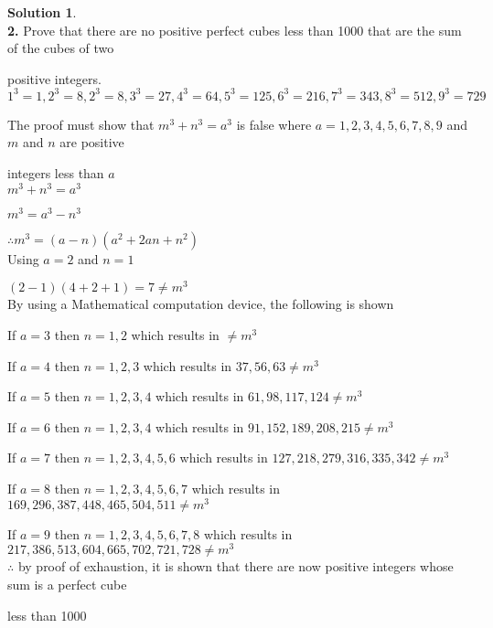 \documentclass{article}
\theoremstyle{definition}
\newtheorem*{solution}{Solution}
\begin{document}
\begin{solution}\ \\



\textbf{2.} Prove that there are no positive perfect cubes less than 1000 that are the sum of the cubes of two


positive integers. \\

$1^{3} = 1, 2^{3} = 8, 2^{3} = 8, 3^{3} = 27, 4^{3} = 64, 5^{3} = 125, 6^{3} = 216, 7^{3} = 343, 8^{3} = 512, 9^{3} = 729 $

The proof must show that $m^3 + n^3 = a^3$ is false where $a = 1,2,3,4,5,6,7,8,9$ and $m$ and $n$ are positive


integers less than $a$ \\


$m^3 + n^3 = a^3$


$m^3 = a^3 - n^3$


$\therefore m^3 = (a-n)(a^2 +2an + n^2)$ \\


Using $a =2$ and $ n = 1$


$(2-1)(4+2+1) = 7 \neq m^3$ \\

By using a Mathematical computation device, the following is shown


If $a = 3$ then $n = 1,2$ which results in $ \neq m^3$


If $a = 4$ then $n = 1,2,3$ which results in $37, 56, 63 \neq m^3$


If $a = 5$ then $n = 1,2,3,4$ which results in $61,98, 117,124 \neq m^3$


If $a = 6$ then $n = 1,2,3,4$ which results in $91, 152, 189, 208, 215 \neq m^3$


If $a = 7$ then $n = 1,2,3,4,5,6$ which results in $ 127, 218, 279, 316, 335, 342 \neq m^3$


If $a = 8$ then $n = 1,2,3,4,5,6,7$ which results in $ 169, 296, 387, 448, 465, 504, 511\neq m^3$


If $a = 9$ then $n = 1,2,3,4,5,6,7,8$ which results in $ 217, 386, 513, 604, 665, 702, 721, 728\neq m^3$\\


$\therefore$ by proof of exhaustion, it is shown that there are now positive integers whose sum is a perfect cube



less than 1000 \\ \ \\



\end{solution}
\end{document}
